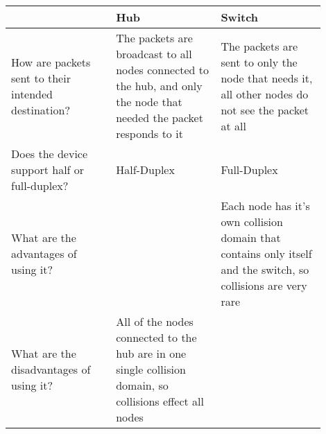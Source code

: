 \begin{center}
  \begin{tabular}{ |p{0.3\linewidth}|p{0.3\linewidth}|p{0.3\linewidth}| }
    \hline
     & Hub & Switch \\
    \hline
    How are packets sent to their intended destination? & The packets are broadcast to all nodes connected to the hub, and only the node that needed the packet responds to it & The packets are sent to only the node that needs it, all other nodes do not see the packet at all \\
    \hline
    Does the device support half or full-duplex? & Half-Duplex & Full-Duplex \\
    \hline
    What are the advantages of using it? &   & Each node has it's own collision domain that contains only itself and the switch, so collisions are very rare \\
    \hline
    What are the disadvantages of using it? & All of the nodes connected to the hub are in one single collision domain, so collisions effect all nodes &   \\
    \hline
  \end{tabular}
\end{center}